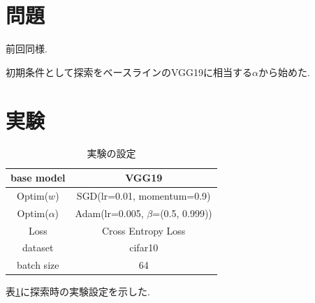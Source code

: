 \documentclass[twocolumn]{jarticle}     %
\begin{document}



\section{問題}
前回同様.

初期条件として探索をベースラインのVGG19に相当する$\alpha$から始めた.

\section{実験}

\begin{table}[tb]
  \begin{center}
    \caption{実験の設定}
    \begin{tabular}{|c|c|} \hline
      base model & VGG19 \\ \hline
      Optim($w$) & SGD(lr=0.01, momentum=0.9) \\ \hline
      Optim($\alpha$) & Adam(lr=0.005, $\beta$=(0.5, 0.999)) \\ \hline
      Loss & Cross Entropy Loss \\ \hline
      dataset & cifar10 \\ \hline
      batch size & 64 \\ \hline
    \end{tabular}
    \label{tab:setting}
  \end{center}
\end{table}

表\ref{tab:setting}に探索時の実験設定を示した.
\end{document}
